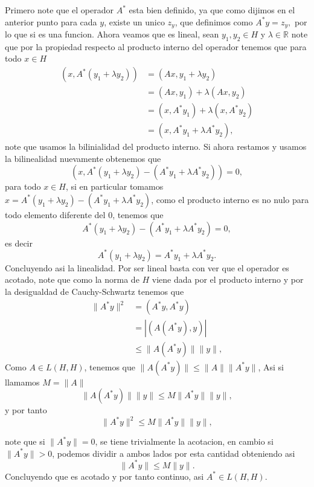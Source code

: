 \begin{itemize}
\begin{sproof}
    Primero note que el operador $A^*$ esta bien definido, ya que como dijimos en el anterior punto para cada $y$, existe un unico $z_y$, que definimos como $A^*y=z_y,$ por lo que si es una funcion. Ahora veamos que es lineal, sean $y_1,y_2\in H$ y $\lambda\in \mathbb R$ note que por la propiedad respecto al producto interno del operador tenemos que para todo $x\in H$
    \begin{align*}
        (x,A^*(y_1+\lambda y_2))&=(Ax,y_1+\lambda y_2)\\
        &=(Ax,y_1)+\lambda(Ax,y_2)\\
        &=(x,A^*y_1)+\lambda(x,A^*y_2)\\
        &=(x,A^*y_1+\lambda A^*y_2),
    \end{align*}
    note que usamos la bilinialidad del producto interno. Si ahora restamos y usamos la bilinealidad nuevamente obtenemos que
    $$(x,A^*(y_1+\lambda y_2)-(A^*y_1+\lambda A^*y_2))=0,$$
    para todo $x\in H$, si en particular tomamos $x=A^*(y_1+\lambda y_2)-(A^*y_1+\lambda A^*y_2)$, como el producto interno es no nulo para todo elemento diferente del 0, tenemos que 
    $$A^*(y_1+\lambda y_2)-(A^*y_1+\lambda A^*y_2)=0,$$
    es decir
    $$A^*(y_1+\lambda y_2)=A^*y_1+\lambda A^*y_2.$$
    Concluyendo asi la linealidad. Por ser lineal basta con ver que el operador es acotado, note que como la norma de $H$ viene dada por el producto interno y por la desigualdad de Cauchy-Schwartz tenemos que
    \begin{align*}
        \|A^*y\|^2&=(A^*y,A^*y)\\
        &=|(A(A^*y),y)|\\
        &\leq\|A(A^*y)\|\|y\|,
    \end{align*}
    Como $A\in L(H,H)$, tenemos que   $\|A(A^*y)\|\leq \|A\|\|A^*y\|$, Asi si llamamos $M=\|A\|$
    $$\|A(A^*y)\|\|y\|\leq M\|A^*y\|\|y\|,$$
    y por tanto
    $$\|A^*y\|^2\leq M\|A^*y\|\|y\| ,$$

    note que si $\|A^* y\|=0$, se tiene trivialmente la acotacion, en cambio si $\|A^* y\|>0$, podemos dividir a ambos lados por esta cantidad obteniendo asi
    $$\|A^*y\|\leq M\|y\|.$$
    Concluyendo que es acotado y por tanto continuo, asi $A^*\in L(H,H).$


\end{sproof}
\end{itemize}
